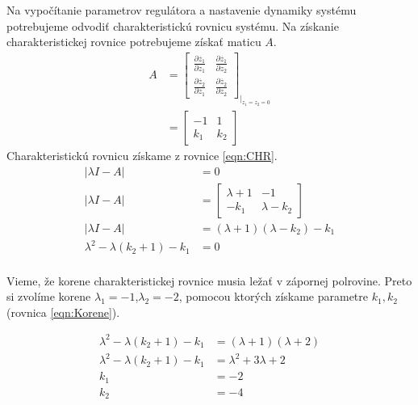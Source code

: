 \documentclass[../main.tex]{subfiles}
\begin{document}
Na vypočítanie parametrov regulátora a nastavenie dynamiky systému potrebujeme odvodiť charakteristickú rovnicu systému.
Na získanie charakteristickej rovnice potrebujeme získať maticu $A$.
\begin{equation}
\begin{split} 
 A  & = \begin{bmatrix} \frac{\partial \dot{z_1}}{\partial z_1}& \frac{\partial \dot{z_1}}{\partial z_2}\\ \frac{\partial \dot{z_2}}{\partial z_1}&\frac{\partial \dot{z_2}}{\partial z_2} \end{bmatrix}_{|_{z_1 = z_2 = 0}} \\
 & = \begin{bmatrix} -1 & 1\\ k_1 & k_2 \end{bmatrix} \
 \end{split}
 \label{eqn:A}
\end{equation}
Charakteristickú rovnicu získame z rovnice \ref{eqn:CHR}.
\begin{equation}
\begin{split} 
 |\lambda I - A| & = 0\\
|\lambda I - A| & = \begin{bmatrix} \lambda +1 & -1\\ -k_1 & \lambda -k_2 \end{bmatrix} \\
|\lambda I - A| & = (\lambda + 1)(\lambda - k_2) - k_1\\
\lambda^2 - \lambda(k_2+1) - k_1 &= 0\\ 
\end{split}
\label{eqn:CHR}
\end{equation}

Vieme, že korene charakteristickej rovnice musia ležať v zápornej polrovine. Preto si zvolíme korene $\lambda_1 = -1$,$\lambda_2 = -2$, pomocou ktorých získame parametre $k_1,k_2$ (rovnica \ref{eqn:Korene}).

\begin{equation}
\begin{split} 
\lambda^2 - \lambda(k_2+1) - k_1 & = (\lambda + 1)(\lambda + 2)\\ 
\lambda^2 - \lambda(k_2+1) - k_1 & = \lambda^2 + 3\lambda + 2\\ 
k_1 &= -2\\
k_2 &= -4\\
\end{split}
\label{eqn:Korene}
\end{equation}
\end{document}
